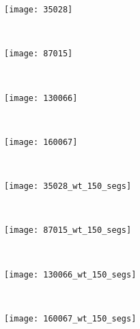 \begin{figure}[!ht]
    \centering
    \begin{subfigure}[t]{\textwidth+20pt\relax}
    	\texttt{[image: 35028]} 
    \end{subfigure}      
    ~ %
    \begin{subfigure}[b]{0.2\textwidth}
        \texttt{[image: 87015]}
    \end{subfigure}
    ~ %
    \begin{subfigure}[b]{0.2\textwidth}
        \texttt{[image: 130066]}
    \end{subfigure}
    ~ %
    \begin{subfigure}[b]{0.2\textwidth}
        \texttt{[image: 160067]}
    \end{subfigure} \\[2ex]       
    
    \begin{subfigure}[t]{\textwidth+20pt\relax}
    	\texttt{[image: 35028\_wt\_150\_segs]} 
    \end{subfigure}      
    ~ %
    \begin{subfigure}[b]{0.2\textwidth}
        \texttt{[image: 87015\_wt\_150\_segs]}
    \end{subfigure}
    ~ %
    \begin{subfigure}[b]{0.2\textwidth}
        \texttt{[image: 130066\_wt\_150\_segs]}
    \end{subfigure}
    ~ %
    \begin{subfigure}[b]{0.2\textwidth}
        \texttt{[image: 160067\_wt\_150\_segs]}
    \end{subfigure} \\ [2ex]
    

\end{figure}
